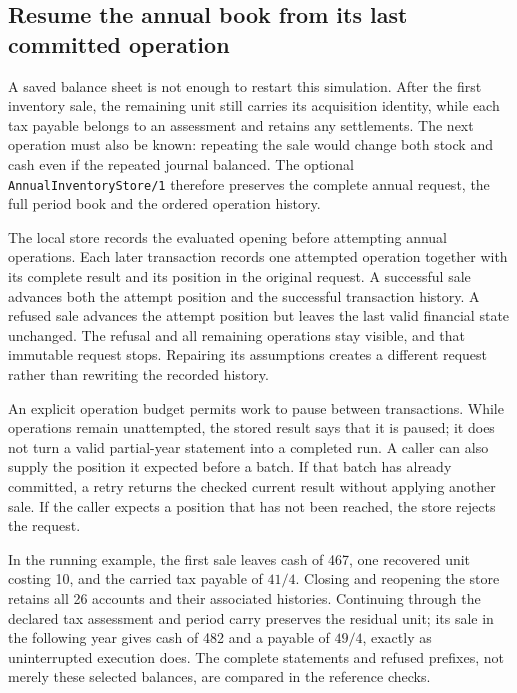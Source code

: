 

\subsection*{Resume the annual book from its last committed operation}

A saved balance sheet is not enough to restart this simulation.  After the
first inventory sale, the remaining unit still carries its acquisition identity,
while each tax payable belongs to an assessment and retains any settlements.
The next operation must also be known: repeating the sale would change both
stock and cash even if the repeated journal balanced.  The optional
\texttt{Annual\allowbreak{}Inventory\allowbreak{}Store/1} therefore preserves the
complete annual request, the full period book and the ordered operation history.

The local store records the evaluated opening before attempting annual
operations.  Each later transaction records one attempted operation together
with its complete result and its position in the original request.  A successful
sale advances both the attempt position and the successful transaction history.
A refused sale advances the attempt position but leaves the last valid financial
state unchanged.  The refusal and all remaining operations stay visible, and
that immutable request stops.  Repairing its assumptions creates a different
request rather than rewriting the recorded history.

An explicit operation budget permits work to pause between transactions.
While operations remain unattempted, the stored result says that it is paused;
it does not turn a valid partial-year statement into a completed run.  A caller
can also supply the position it expected before a batch.  If that batch has
already committed, a retry returns the checked current result without applying
another sale.  If the caller expects a position that has not been reached, the
store rejects the request.

In the running example, the first sale leaves cash of 467, one recovered unit
costing 10, and the carried tax payable of \(41/4\).  Closing and reopening the
store retains all 26 accounts and their associated histories.  Continuing through
the declared tax assessment and period carry preserves the residual unit; its
sale in the following year gives cash of 482 and a payable of \(49/4\), exactly
as uninterrupted execution does.  The complete statements and refused prefixes,
not merely these selected balances, are compared in the reference checks.

